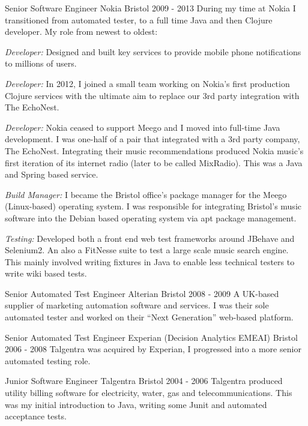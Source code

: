 \begin{cventries}
  \cventrypara
    {Senior Software Engineer} %
    {Nokia } %
    {Bristol} %
    {2009  - 2013} %
    {During my time at Nokia I transitioned from automated tester, to a full time Java and then Clojure developer. My role from newest to oldest:}
    {
      \begin{cvitems} %
        \item {\emph{Developer:} Designed and built key services to provide mobile phone notifications to millions of users.}
        \item {\emph{Developer:} In 2012, I joined a small team working on Nokia's first production Clojure services with the ultimate aim to replace our 3rd party integration with The EchoNest.}
        \item {\emph{Developer:} Nokia ceased to support Meego and I moved into full-time Java development. I was one-half of a pair that integrated with a 3rd party company, The EchoNest. Integrating their music recommendations produced Nokia music’s first iteration of its internet radio (later to be called MixRadio). This was a Java and Spring based service.}
        \item {\emph{Build Manager:} I became the Bristol office's package manager for the Meego (Linux-based) operating system. I was responsible for integrating Bristol's music software into the Debian based operating system via apt package management.}
        \item {\emph{Testing:} Developed both a front end web test frameworks around JBehave and Selenium2. An also a  FitNesse suite to test a large scale music search engine. This mainly involved writing fixtures in Java to enable less technical testers to write wiki based tests.}
      \end{cvitems}
    }

  \cventry
    {Senior Automated Test Engineer} %
    {Alterian} %
    {Bristol} %
    {2008  - 2009} %
    {A UK-based supplier of marketing automation software and services. I was their sole automated tester and worked on
    their “Next Generation” web-based platform.}

  \cventry
    {Senior Automated Test Engineer} %
    {Experian (Decision Analytics EMEAI)} %
    {Bristol} %
    {2006  - 2008} %
    {Talgentra was acquired by Experian, I progressed into a more senior automated testing role.}

  \cventry
    {Junior Software Engineer } %
    {Talgentra} %
    {Bristol} %
    {2004 - 2006} %
    {Talgentra produced utility billing software for electricity, water, gas and telecommunications. This was my initial introduction to Java, writing some Junit and automated acceptance tests.
    }
\end{cventries}
